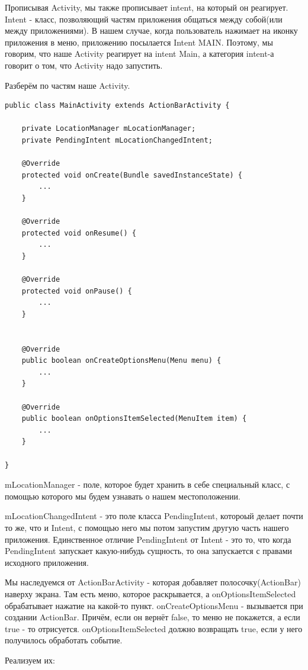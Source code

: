 \documentclass[12 pt]{article}
\begin{document}
    Прописывая Activity, мы также прописывает intent, на который он реагирует. Intent - класс, позволяющий частям приложения общаться между собой(или между приложениями). В нашем случае, когда пользователь нажимает на иконку приложения в меню, приложению посылается Intent MAIN. Поэтому, мы говорим, что наше Activity реагирует на intent Main, а категория intent-а говорит о том, что Activity надо запустить.
    
    Разберём по частям наше Activity. 
    
    \begin{lstlisting}
public class MainActivity extends ActionBarActivity {

    private LocationManager mLocationManager;
    private PendingIntent mLocationChangedIntent;

    @Override
    protected void onCreate(Bundle savedInstanceState) {
        ...
    }

    @Override
    protected void onResume() {
        ...
    }

    @Override
    protected void onPause() {
        ...
    }


    @Override
    public boolean onCreateOptionsMenu(Menu menu) {
        ...
    }

    @Override
    public boolean onOptionsItemSelected(MenuItem item) {
        ...
    }

}
    \end{lstlisting}
    
    mLocationManager - поле, которое будет хранить в себе специальный класс, с помощью которого мы будем узнавать о нашем местоположении. 
    
    mLocationChangedIntent - это поле класса PendingIntent, котороый делает почти то же, что и Intent, с помощью него мы потом запустим другую часть нашего приложения. Единственное отличие PendingIntent от Intent - это то, что когда PendingIntent запускает какую-нибудь сущность, то она запускается с правами исходного приложения. 
    
    Мы наследуемся от ActionBarActivity - которая добавляет полосочку(ActionBar) наверху экрана. Там есть меню, которое раскрывается, а onOptionsItemSelected обрабатывает нажатие на какой-то пункт. onCreateOptionsMenu - вызывается при создании ActionBar. Причём, если он вернёт false, то меню не покажется, а если true - то отрисуется. onOptionsItemSelected должно возвращать true, если у него получилось обработать событие.
    
    Реализуем их:
    
\end{document}
